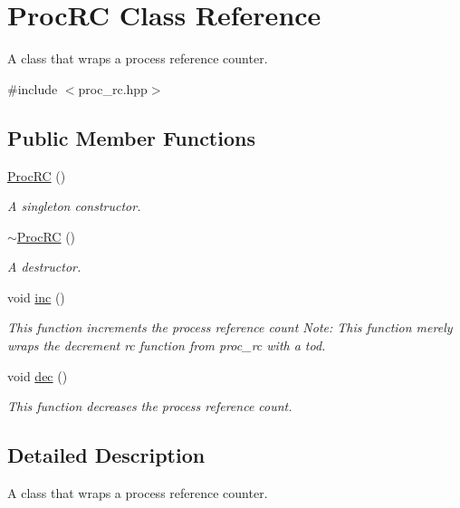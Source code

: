 \hypertarget{class_proc_r_c}{}\section{Proc\+RC Class Reference}
\label{class_proc_r_c}


A class that wraps a process reference counter.  




{\ttfamily \#include $<$proc\+\_\+rc.\+hpp$>$}

\subsection*{Public Member Functions}
\begin{DoxyCompactItemize}
\item 
\hyperlink{class_proc_r_c_aaf90e0e0b95504fda9089c6658fab53f}{Proc\+RC} ()
\begin{DoxyCompactList}\small\item\em A singleton constructor. \end{DoxyCompactList}\item 
\hyperlink{class_proc_r_c_a76d4c0e75b434d4a262cc34fc2bd7a1a}{$\sim$\+Proc\+RC} ()
\begin{DoxyCompactList}\small\item\em A destructor. \end{DoxyCompactList}\item 
void \hyperlink{class_proc_r_c_aa7512c99348dd22dd45e15b575bdd316}{inc} ()
\begin{DoxyCompactList}\small\item\em This function increments the process reference count Note\+: This function merely wraps the decrement rc function from proc\+\_\+rc with a tod. \end{DoxyCompactList}\item 
void \hyperlink{class_proc_r_c_adf71fc8726ffb2e26ed424331c12a99b}{dec} ()
\begin{DoxyCompactList}\small\item\em This function decreases the process reference count. \end{DoxyCompactList}\end{DoxyCompactItemize}


\subsection{Detailed Description}
A class that wraps a process reference counter. 

